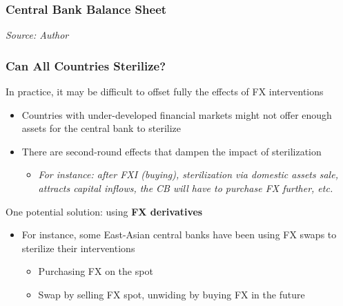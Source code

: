 \documentclass{beamer}
\newenvironment{wideitemize}{\itemize\addtolength{\itemsep}{10pt}}{\enditemize}
\begin{document}
\begin{frame}
\frametitle{Central Bank Balance Sheet}
\medskip
\emph{Source: Author}
\end{frame}


\begin{frame}
  \frametitle{Can All Countries Sterilize?}
  \begin{wideitemize}
  \item In practice, it may be difficult to offset fully the effects of FX interventions
    \begin{itemize}
    \item Countries with under-developed financial markets might not offer enough assets for the central bank to sterilize
    \item There are second-round effects that dampen the impact of sterilization
      \begin{itemize}
      \item \emph{For instance: after FXI (buying), sterilization via domestic assets sale, attracts capital inflows, the CB will have to purchase FX further, etc.}
      \end{itemize}
    \end{itemize}
  \item One potential solution: using \textbf{FX derivatives}
    \begin{itemize}
    \item For instance, some East-Asian central banks have been using FX swaps to sterilize their interventions
      \begin{itemize}
      \item Purchasing FX on the spot
      \item Swap by selling FX spot, unwiding by buying FX in the future
      \end{itemize}
    \end{itemize}
  \end{wideitemize}
\end{frame}
\end{document}
